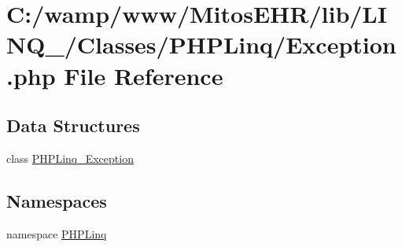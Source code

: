 \hypertarget{_exception_8php}{\section{\-C\-:/wamp/www/\-Mitos\-E\-H\-R/lib/\-L\-I\-N\-Q\-\_/\-Classes/\-P\-H\-P\-Linq/\-Exception.php \-File \-Reference}
\label{_exception_8php}
}
\subsection*{\-Data \-Structures}
\begin{DoxyCompactItemize}
\item 
class \hyperlink{class_p_h_p_linq___exception}{\-P\-H\-P\-Linq\-\_\-\-Exception}
\end{DoxyCompactItemize}
\subsection*{\-Namespaces}
\begin{DoxyCompactItemize}
\item 
namespace \hyperlink{namespace_p_h_p_linq}{\-P\-H\-P\-Linq}
\end{DoxyCompactItemize}
